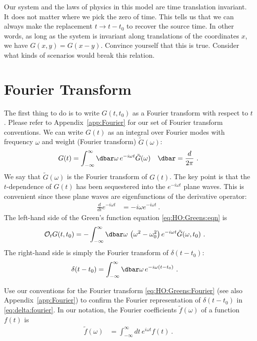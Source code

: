 \begin{exercise}
Our system and the laws of physics in this model are time translation invariant. It does not matter where we pick the zero of time. This tells us that we can always make the replacement $t\to t-t_0$ to recover the source time. In other words, as long as the system is invariant along translations of the coordinates $x$, we have $G(x,y) = G(x-y)$. Convince yourself that this is true. Consider what kinds of scenarios would break this relation.
\end{exercise}

\section{Fourier Transform}

The first thing to do is to write $G(t,t_0)$ as a Fourier transform with respect to $t$. Please refer to Appendix~\ref{app:Fourier} for our set of Fourier transform conventions. We can write $G(t)$ as an integral over Fourier modes with frequency $\omega$ and weight (Fourier transform) $\tilde G(\omega)$:
\begin{align}
  G(t) &= \int_{-\infty}^\infty\dbar \omega \, e^{-i\omega t} \tilde G(\omega) 
  &
  \dbar = \frac{d}{2\pi}
  \ .
  \label{eq:HO:Greens:Fourier}
\end{align}
We say that $\tilde G(\omega)$ is the Fourier transform of $G(t)$. The key point is that the $t$-dependence of $G(t)$ has been sequestered into the $e^{-i\omega t}$ plane waves. This is convenient since these plane waves are eigenfunctions of the derivative operator:
\begin{align}
  \frac{d}{dt} e^{-i\omega t} &= -i\omega e^{-i\omega t} \ .
\end{align}
The left-hand side of the Green's function equation \eqref{eq:HO:Greens:eqn} is
\begin{align}
  \mathcal O_t G(t,t_0) 
  &= 
  -
  \int_{-\infty}^\infty \dbar \omega \, 
  \left(\omega^2-\omega_0^2\right) e^{-i\omega t} \tilde G(\omega,t_0) \ .
\end{align}
The right-hand side is simply the Fourier transform of $\delta(t-t_0)$:
\begin{align}
  \delta(t-t_0)
  &=
  \int_{-\infty}^\infty \dbar \omega \, e^{-i\omega (t-t_0)} \ .
  \label{eq:delta:fourier}
\end{align}
\begin{exercise}
Use our conventions for the Fourier transform \eqref{eq:HO:Greens:Fourier} (see also Appendix~\ref{app:Fourier}) to confirm the Fourier representation of $\delta(t-t_0)$ in \eqref{eq:delta:fourier}. In our notation, the Fourier coefficients $\tilde f(\omega)$ of a function $f(t)$ is
\begin{align}
  \tilde f(\omega) &= 
  \int_{-\infty}^\infty d t\, e^{i\omega t} f(t) \ .
\end{align}
\end{exercise}
